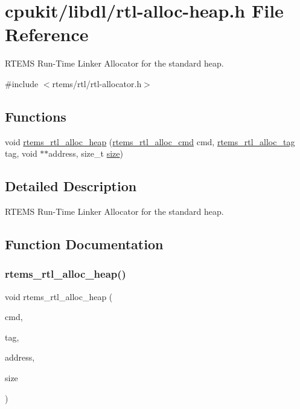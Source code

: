 \hypertarget{rtl-alloc-heap_8h}{}\section{cpukit/libdl/rtl-\/alloc-\/heap.h File Reference}
\label{rtl-alloc-heap_8h}


R\+T\+E\+MS Run-\/\+Time Linker Allocator for the standard heap.  


{\ttfamily \#include $<$rtems/rtl/rtl-\/allocator.\+h$>$}\newline
\subsection*{Functions}
\begin{DoxyCompactItemize}
\item 
void \mbox{\hyperlink{rtl-alloc-heap_8h_a5725b252e21bd77ce9fe5a026c1b886f}{rtems\+\_\+rtl\+\_\+alloc\+\_\+heap}} (\mbox{\hyperlink{rtl-allocator_8h_aab433aa2d9689f924523cc8196318daf}{rtems\+\_\+rtl\+\_\+alloc\+\_\+cmd}} cmd, \mbox{\hyperlink{rtl-allocator_8h_a445a8615118b7fc14005ab20583153fd}{rtems\+\_\+rtl\+\_\+alloc\+\_\+tag}} tag, void $\ast$$\ast$address, size\+\_\+t \mbox{\hyperlink{sun4u_2tte_8h_a245260f6f74972558f61b85227df5aae}{size}})
\end{DoxyCompactItemize}


\subsection{Detailed Description}
R\+T\+E\+MS Run-\/\+Time Linker Allocator for the standard heap. 



\subsection{Function Documentation}
\mbox{\label{rtl-alloc-heap_8h_a5725b252e21bd77ce9fe5a026c1b886f}} 
\subsubsection{\texorpdfstring{rtems\_rtl\_alloc\_heap()}{rtems\_rtl\_alloc\_heap()}}
{\footnotesize\ttfamily void rtems\+\_\+rtl\+\_\+alloc\+\_\+heap (\begin{DoxyParamCaption}\item[{\mbox{\hyperlink{rtl-allocator_8h_aab433aa2d9689f924523cc8196318daf}{rtems\+\_\+rtl\+\_\+alloc\+\_\+cmd}}}]{cmd,  }\item[{\mbox{\hyperlink{rtl-allocator_8h_a445a8615118b7fc14005ab20583153fd}{rtems\+\_\+rtl\+\_\+alloc\+\_\+tag}}}]{tag,  }\item[{void $\ast$$\ast$}]{address,  }\item[{size\+\_\+t}]{size }\end{DoxyParamCaption})}

